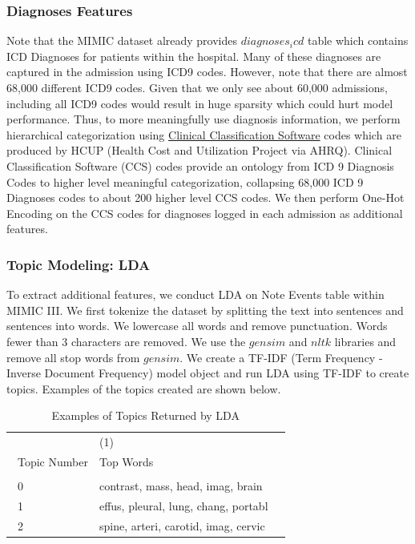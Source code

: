 \documentclass[12pt, final]{article}
\begin{document}
\subsubsection{Diagnoses Features}
Note that the MIMIC dataset already provides $diagnoses_icd$ table which contains ICD Diagnoses for patients within the hospital. Many of these diagnoses are captured in the admission using ICD9 codes. However, note that there are almost 68,000 different ICD9 codes. Given that we only see about 60,000 admissions, including all ICD9 codes would result in huge sparsity which could hurt model performance. Thus, to more meaningfully use diagnosis information, we perform hierarchical categorization using \href{https://www.hcup-us.ahrq.gov/toolssoftware/ccs/ccs.jsp}{Clinical Classification Software} codes which are produced by HCUP (Health Cost and Utilization Project via AHRQ). Clinical Classification Software (CCS) codes provide an ontology from ICD 9 Diagnosis Codes to higher level meaningful categorization, collapsing 68,000 ICD 9 Diagnoses codes to about 200 higher level CCS codes. We then perform One-Hot Encoding on the CCS codes for diagnoses logged in each admission as additional features.

\subsubsection{Topic Modeling: LDA}
To extract additional features, we conduct LDA on Note Events table within MIMIC III. We first tokenize the dataset by splitting the text into sentences and sentences into words. We lowercase all words and remove punctuation. Words fewer than 3 characters are removed. We use the $gensim$ and $nltk$ libraries and remove all stop words from $gensim$. We create a TF-IDF (Term Frequency - Inverse Document Frequency) model object and run LDA using TF-IDF to create topics. Examples of the topics created are shown below.

\begin{table}[H]
\footnotesize
{}%
\caption{Examples of Topics Returned by LDA}
\label{LDA}
\centering
\begin{tabularx}{\textwidth}{l C C}\hline
 & (1) \\\
Topic Number & Top Words \\ \hline
 &    \\\
0 & contrast, mass, head, imag, brain  \\\
1 & effus, pleural, lung, chang, portabl \\\
2 & spine, arteri, carotid, imag, cervic
\end{tabularx}
\end{table}
\end{document}
